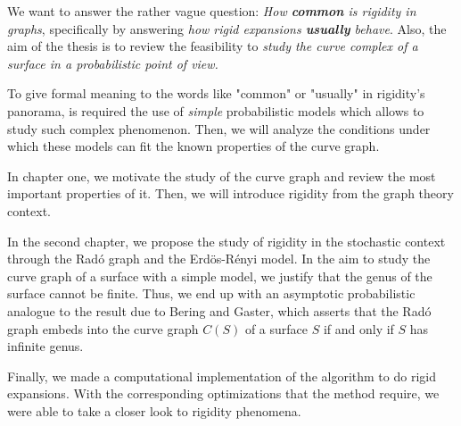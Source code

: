 We want to answer the rather vague question: \textit{How \textbf{common} is rigidity in graphs}, specifically by answering \textit{how rigid expansions \textbf{usually} behave}. Also, the aim of the thesis is to review the feasibility to \textit{study the curve complex of a surface in a probabilistic point of view.}

To give formal meaning to the words like "common" or "usually" in rigidity's panorama, is required the use of \textit{simple} probabilistic models which allows to study such complex phenomenon. Then, we will analyze the conditions under which these models can fit the known properties of the curve graph.

In chapter one, we motivate the study of the curve graph and review the most important properties of it. Then, we will introduce rigidity from the graph theory context.

In the second chapter, we propose the study of rigidity in the stochastic context through the Radó graph and the Erdös-Rényi model. In the aim to study the curve graph of a surface with a simple model, we justify that the genus of the surface cannot be finite. Thus, we end up with an asymptotic probabilistic analogue to the result due to Bering and Gaster, which asserts that the Radó graph embeds into the curve graph $C(S)$ of a surface $S$ if and only if $S$ has infinite genus.

Finally, we made a computational implementation of the algorithm to do rigid expansions. With the corresponding optimizations that the method require, we were able to take a closer look to rigidity phenomena.